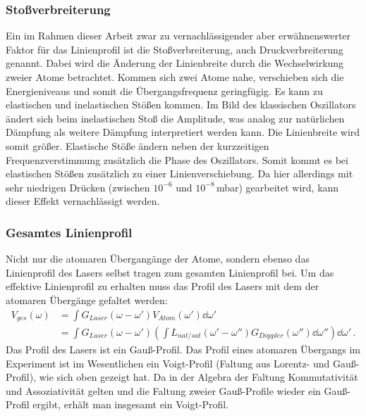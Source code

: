 \subsubsection{Stoßverbreiterung}\label{subsubsec:stossverbreiterung}
Ein im Rahmen dieser Arbeit zwar zu vernachlässigender aber erwähnenswerter
Faktor für das Linienprofil ist die Stoßverbreiterung, auch
Druckverbreiterung genannt. Dabei wird die Änderung der Linienbreite durch die
Wechselwirkung zweier Atome betrachtet. Kommen sich zwei Atome nahe, verschieben
sich die Energieniveaus und somit die Übergangsfrequenz geringfügig. Es kann zu
elastischen und inelastischen Stößen kommen. Im Bild des klassischen Oszillators
ändert sich beim inelastischen Stoß die Amplitude, was analog zur natürlichen
Dämpfung als weitere Dämpfung interpretiert werden kann. Die Linienbreite wird
somit größer. Elastische Stöße ändern neben der kurzzeitigen Frequenzverstimmung
zusätzlich die Phase des Oszillators. Somit kommt es bei elastischen Stößen
zusätzlich zu einer Linienverschiebung. Da hier allerdings mit
sehr niedrigen Drücken (zwischen $10^{-6}$ und $10^{-8}\,$mbar) gearbeitet wird, kann dieser Effekt vernachlässigt werden.

\subsubsection{Gesamtes Linienprofil}\label{subsubsec:ges-linienprofil}
Nicht nur die atomaren Übergangänge der Atome, sondern ebenso das Linienprofil
des Lasers selbst tragen zum gesamten Linienprofil bei. Um das effektive
Linienprofil zu erhalten muss das Profil des Lasers mit dem der atomaren
Übergänge gefaltet werden:
\begin{equation}\label{eq:voigt}
	\begin{split}
		V_{ges}(\omega)
		&=\int{G_{Laser}(\omega-\omega')V_{Atom}(\omega')\dd\omega'}\\
		&=\int{G_{Laser}(\omega-\omega')\left(\int{L_{nat/sat}(\omega'-\omega'')G_{Doppler}(\omega'')\dd\omega''}\right)\dd\omega'}\,.
	\end{split}
\end{equation}
Das Profil des Lasers ist ein Gauß-Profil. Das Profil eines atomaren Übergangs
im Experiment ist im Wesentlichen ein Voigt-Profil (Faltung aus Lorentz- und
Gauß-Profil), wie sich oben gezeigt hat. Da in der Algebra der Faltung
Kommutativität und Assoziativität gelten und die Faltung zweier Gauß-Profile
wieder ein Gauß-Profil ergibt, erhält man insgesamt ein Voigt-Profil.

